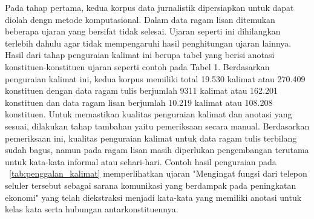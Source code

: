 Pada tahap pertama, kedua korpus data jurnalistik dipersiapkan untuk dapat diolah dengn metode komputasional. Dalam data ragam lisan ditemukan beberapa ujaran yang bersifat tidak selesai. Ujaran seperti ini dihilangkan terlebih dahulu agar tidak mempengaruhi hasil penghitungan ujaran lainnya. Hasil dari tahap penguraian kalimat ini berupa tabel yang berisi anotasi konstituen-konstituen ujaran seperti contoh pada Tabel 1. Berdasarkan penguraian kalimat ini, kedua korpus memiliki total 19.530 kalimat atau 270.409 konstituen dengan data ragam tulis berjumlah 9311 kalimat atau 162.201 konstituen dan data ragam lisan berjumlah 10.219 kalimat atau 108.208 konstituen. Untuk memastikan kualitas penguraian kalimat dan anotasi yang sesuai, dilakukan tahap tambahan yaitu pemeriksaan secara manual. Berdasarkan pemeriksaan ini, kualitas penguraian kalimat untuk data ragam tulis terbilang sudah bagus, namun pada ragam lisan masih diperlukan pengembangan terutama untuk kata-kata informal atau sehari-hari. Contoh hasil penguraian pada \tab~\ref{tab:penggalan_kalimat} memperlihatkan ujaran "Mengingat fungsi dari telepon seluler tersebut sebagai sarana komunikasi yang berdampak pada peningkatan ekonomi" yang telah diekstraksi menjadi kata-kata yang memiliki anotasi untuk kelas kata serta hubungan antarkonstituennya. 

